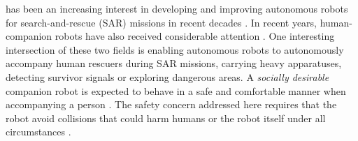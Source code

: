 \documentclass[journal]{IEEEtran}
\newcommand{\todohere}[1]{\hl{(\textbf{TODO:} #1)}}
\DeclareRobustCommand{\clnote}[1]{\ifthenelse{\boolean{include-notes}}%
{\textcolor{orange}{\textbf{CL: #1}}}{}}
\DeclareRobustCommand{\dhnote}[1]{\ifthenelse{\boolean{include-notes}}%
{\textcolor{blue}{\textbf{DH: #1}}}{}}
\begin{document}
     has been an increasing interest in developing and improving autonomous robots for search-and-rescue (SAR) missions in recent decades \cite{casper2003human,shen2011autonomous,ryan2013lmi,govindarajan2016human,kruijff2012designing}.
	In recent years, human-companion robots have also received considerable attention \cite{rios2015proxemics,ferrer2016robot,cosgun2013autonomous}. One interesting intersection of these two fields is enabling autonomous robots to autonomously accompany human rescuers during SAR missions, carrying heavy apparatuses, detecting survivor signals or exploring dangerous areas.
    A \textit{socially desirable} companion robot is expected to behave in a safe and comfortable manner when accompanying a person \cite{kruse2013human,rios2015proxemics}.
    The safety concern addressed here requires that the robot avoid collisions that could harm humans or the robot itself under all circumstances \cite{svenstrup2010trajectory}.
\end{document}
